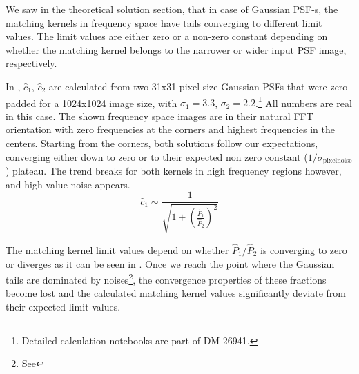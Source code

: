 %
\par We saw in the theoretical solution section, that in case of
Gaussian PSF-s, the matching kernels in frequency space have tails
converging to different limit values. The limit values are either zero
or a non-zero constant depending on whether the matching kernel belongs
to the narrower or wider input PSF image, respectively.
%
\par In , \(\hat{c}_1\),
\(\hat{c}_2\) are calculated from two 31x31 pixel size Gaussian PSFs
that were zero padded for a 1024x1024 image size, with
\(\sigma_1=3.3\), \(\sigma_2=2.2\).\footnote{Detailed calculation
notebooks are part of DM-26941.} All numbers are real in this
case. The shown frequency space images are in their natural FFT
orientation with zero frequencies at the corners and highest
frequencies in the centers. Starting from the corners, both solutions
follow our expectations, converging either down to zero or to their
expected non zero constant (\( 1/\sigma_{\mathrm{pixelnoise}} \) )
plateau. The trend breaks for both kernels in high frequency regions
however, and high value noise appears.
\begin{equation}
\hat{c}_1 \sim \frac{1}{\sqrt{1 + \left(\frac{\hat{P}_1}{\hat{P}_2}\right)^2}}
\label{eq:c1conv}
\end{equation}
\par The matching kernel limit values depend on whether
\(\hat{P}_1/\hat{P}_2\) is converging to zero or diverges as it can be seen
in . Once we reach the point where the Gaussian tails are
dominated by noises\footnote{See }, the convergence
properties of these fractions become lost and the calculated matching kernel
values significantly deviate from their expected limit values.
%
